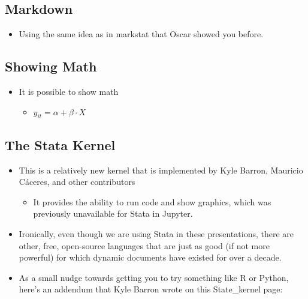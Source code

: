 \documentclass[10pt,parskip=half,
	toc=sectionentrywithdots,
	bibliography=totocnumbered,
	captions=tableheading,numbers=noendperiod]{scrartcl}
\providecommand{\tightlist}{%
  \setlength{\itemsep}{0pt}\setlength{\parskip}{0pt}}
\begin{document}
\hypertarget{markdown}{%
\subsection{Markdown}\label{markdown}}

\begin{itemize}
\tightlist
\item
  Using the same idea as in markstat that Oscar showed you before.
\end{itemize}

\hypertarget{showing-math}{%
\subsection{Showing Math}\label{showing-math}}

\begin{itemize}
\tightlist
\item
  It is possible to show math

  \begin{itemize}
  \tightlist
  \item
    \(y_{it} = \alpha + \beta\cdot X\)
  \end{itemize}
\end{itemize}

\hypertarget{the-stata-kernel}{%
\subsection{The Stata Kernel}\label{the-stata-kernel}}

\begin{itemize}
\tightlist
\item
  This is a relatively new kernel that is implemented by Kyle Barron,
  Mauricio Cáceres, and other contributors

  \begin{itemize}
  \tightlist
  \item
    It provides the ability to run code and show graphics, which was
    previously unavailable for Stata in Jupyter.
  \end{itemize}
\item
  Ironically, even though we are using Stata in these presentations,
  there are other, free, open-source languages that are just as good (if
  not more powerful) for which dynamic documents have existed for over a
  decade.
\item
  As a small nudge towards getting you to try something like R or
  Python, here's an addendum that Kyle Barron wrote on this
  State\_kernel page:
\end{itemize}
\end{document}
